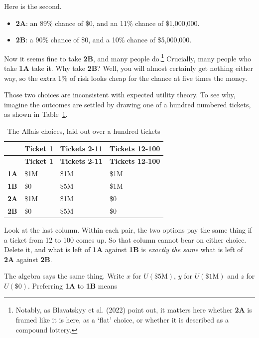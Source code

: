 \documentclass[
  11pt,
  letterpaper,
]{scrbook}
\providecommand{\tightlist}{%
  \setlength{\itemsep}{0pt}\setlength{\parskip}{0pt}}
\begin{document}
Here is the second.

\begin{itemize}
\tightlist
\item
  \textbf{2A}: an 89\% chance of \$0, and an 11\% chance of \$1,000,000.
\item
  \textbf{2B}: a 90\% chance of \$0, and a 10\% chance of \$5,000,000.
\end{itemize}

Now it seems fine to take \textbf{2B}, and many people do.\footnote{Notably,
  as Blavatskyy et al. (2022) point out, it matters here whether
  \textbf{2A} is framed like it is here, as a `flat' choice, or whether
  it is described as a compound lottery.} Crucially, many people who
take \textbf{1A} take it. Why take \textbf{2B}? Well, you will almost
certainly get nothing either way, so the extra 1\% of risk looks cheap
for the chance at five times the money.

Those two choices are inconsistent with expected utility theory. To see
why, imagine the outcomes are settled by drawing one of a hundred
numbered tickets, as shown in Table~\ref{tbl-allais}.

\begin{longtable}[]{@{}llll@{}}
\caption{The Allais choices, laid out over a hundred
tickets}\label{tbl-allais}\tabularnewline
\toprule\noalign{}
& \textbf{Ticket 1} & \textbf{Tickets 2-11} & \textbf{Tickets 12-100} \\
\midrule\noalign{}
\endfirsthead
\toprule\noalign{}
& \textbf{Ticket 1} & \textbf{Tickets 2-11} & \textbf{Tickets 12-100} \\
\midrule\noalign{}
\endhead
\bottomrule\noalign{}
\endlastfoot
\textbf{1A} & \$1M & \$1M & \$1M \\
\textbf{1B} & \$0 & \$5M & \$1M \\
\textbf{2A} & \$1M & \$1M & \$0 \\
\textbf{2B} & \$0 & \$5M & \$0 \\
\end{longtable}

Look at the last column. Within each pair, the two options pay the same
thing if a ticket from 12 to 100 comes up. So that column cannot bear on
either choice. Delete it, and what is left of \textbf{1A} against
\textbf{1B} is \emph{exactly the same} what is left of \textbf{2A}
against \textbf{2B}.

The algebra says the same thing. Write \(x\) for \(U(\$5\text{M})\),
\(y\) for \(U(\$1\text{M})\) and \(z\) for \(U(\$0)\). Preferring
\textbf{1A} to \textbf{1B} means
\end{document}
